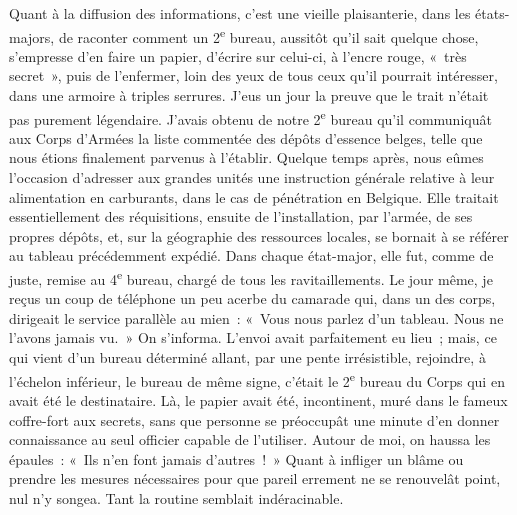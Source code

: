 \documentclass[french,twoside]{book} %
\begin{document}
Quant à la diffusion des informations, c’est une vieille plaisanterie, dans les états-majors, de raconter comment un 2\textsuperscript{e} bureau, aussitôt qu’il sait quelque chose, s’empresse d’en faire un papier, d’écrire sur celui-ci, à l’encre rouge, « très secret », puis de l’enfermer, loin des yeux de tous ceux qu’il pourrait intéresser, dans une armoire à triples serrures. J’eus un jour la preuve que le trait n’était pas purement légendaire. J’avais obtenu de notre 2\textsuperscript{e} bureau qu’il communiquât aux Corps d’Armées la liste commentée des dépôts d’essence belges, telle que nous étions finalement parvenus à l’établir. Quelque temps après, nous eûmes l’occasion d’adresser aux grandes unités une instruction générale relative à leur alimentation en carburants, dans le cas de pénétration en Belgique. Elle traitait essentiellement des réquisitions, ensuite de l’installation, par l’armée, de ses propres dépôts, et, sur la géographie des ressources locales, se bornait à se référer au tableau précédemment expédié. Dans chaque état-major, elle fut, comme de juste, remise au 4\textsuperscript{e} bureau, chargé de tous les ravitaillements. Le jour même, je reçus un coup de téléphone un peu acerbe du camarade qui, dans un des corps, dirigeait le service parallèle au mien : « Vous nous parlez d’un tableau. Nous ne l’avons jamais vu. » On s’informa. L’envoi avait parfaitement eu lieu ; mais, ce qui vient d’un bureau   déterminé allant, par une pente irrésistible, rejoindre, à l’échelon inférieur, le bureau de même signe, c’était le 2\textsuperscript{e} bureau du Corps qui en avait été le destinataire. Là, le papier avait été, incontinent, muré dans le fameux coffre-fort aux secrets, sans que personne se préoccupât une minute d’en donner connaissance au seul officier capable de l’utiliser. Autour de moi, on haussa les épaules : « Ils n’en font jamais d’autres ! » Quant à infliger un blâme ou prendre les mesures nécessaires pour que pareil errement ne se renouvelât point, nul n’y songea. Tant la routine semblait indéracinable.\par
\end{document}
